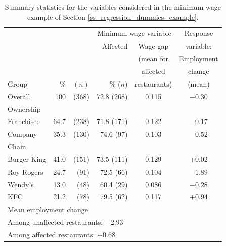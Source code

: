 \begin{table}
\caption{Summary statistics for the variables considered in the minimum
wage example of Section \ref{ss_regression_dummies_example}.}
\label{t_fastfood_descr}
\begin{center}
\begin{tabular}{|l|rr||r|c|c|}\hline
& & & \multicolumn{2}{|c|}{Minimum wage variable} & Response \\ \cline{4-5}
& & & Affected & Wage gap & variable: \\
& & &  & (mean for & Employment \\
& & &  & affected & change \\
Group & \% & $(n)$ & \% ($n$)& restaurants)& (mean) \\ \hline
Overall & 100 & (368) & 72.8 (268) & 0.115 & $-0.30$ \\[1ex]
Ownership & &  & & & \\
\hspace*{1em}Franchisee & 64.7 & (238) & 71.8 (171) &  0.122 & $-0.17$\\
\hspace*{1em}Company & 35.3 & (130) & 74.6\hspace*{.5em} (97) &  0.103 &
$-0.52$\\[1ex]
Chain & & & & & \\
\hspace*{1em}Burger King & 41.0 & (151)& 73.5 (111) & 0.129 & $+0.02$ \\
\hspace*{1em}Roy Rogers & 24.7 & (91) & 72.5\hspace*{.5em} (66)& 0.104 &
$-1.89$ \\
\hspace*{1em}Wendy's & 13.0 & (48)  & 60.4\hspace*{.5em} (29)& 0.086 &
$-0.28$\\
\hspace*{1em}KFC & 21.2 & (78) & 79.5\hspace*{.5em} (62)& 0.117 &
$+0.94$\\
\hline \hline
\multicolumn{6}{|l|}{
Mean employment change}\\
\multicolumn{6}{|l|}{
\hspace*{2em}
Among unaffected restaurants: $-2.93$} \\
\multicolumn{6}{|l|}{
\hspace*{2em}
Among affected restaurants: \hspace*{1.1em}$+0.68$} \\
\hline
\end{tabular}
\end{center}
\vspace*{-3ex}
\end{table}


